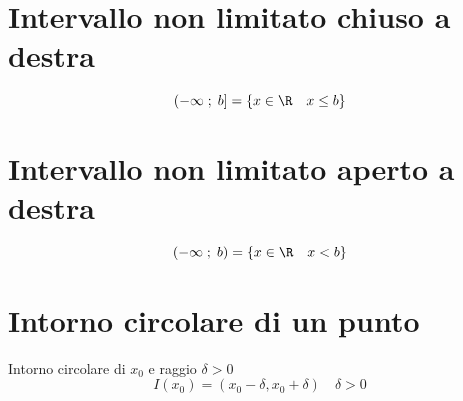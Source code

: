 \section{Intervallo non limitato chiuso a destra}
\begin{equation}
\left(-\infty\; ;\; b\right]=\lbrace x\in\R\quad x\leq b\rbrace
\end{equation}
\section{Intervallo non limitato aperto a destra}
\begin{equation}
\left(-\infty\; ;\; b\right)=\lbrace x\in\R\quad x< b\rbrace
\end{equation}
\section{Intorno circolare di un punto}
Intorno circolare di $x_0$ e raggio $\delta>0$
\begin{equation}
I(x_0)=\left(x_0-\delta,x_0+\delta
\right)\quad\delta>0
\end{equation}